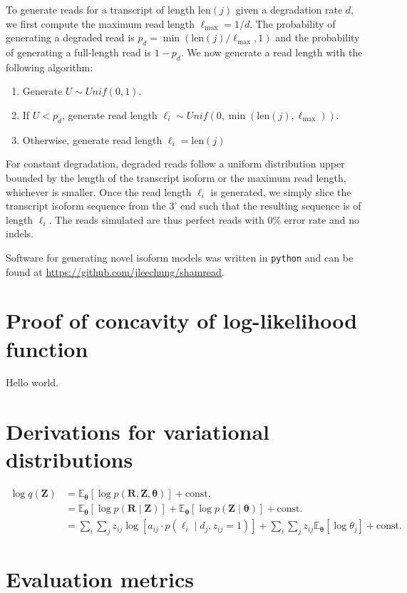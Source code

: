 To generate reads for a transcript of length $\mathrm{len}(j)$ given a degradation rate $d$, we first compute the maximum read length $\ell_\mathrm{max}=1/d$. The probability of generating a degraded read is $p_d=\min(\mathrm{len}(j)/\ell_\mathrm{max}, 1)$ and the probability of generating a full-length read is $1-p_d$. We now generate a read length with the following algorithm:
\begin{enumerate}
    \item Generate $U\sim Unif(0,1)$.
    \item If $U<p_d$, generate read length $\ell_i\sim Unif(0,\min(\mathrm{len}(j),\ell_\mathrm{max}))$.
    \item Otherwise, generate read length $\ell_i=\mathrm{len}(j)$
\end{enumerate}
For constant degradation, degraded reads follow a uniform distribution upper bounded by the length of the transcript isoform or the maximum read length, whichever is smaller. Once the read length $\ell_i$ is generated, we simply slice the transcript isoform sequence from the 3' end such that the resulting sequence is of length $\ell_i$. The reads simulated are thus perfect reads with 0\% error rate and no indels. 

Software for generating novel isoform models was written in \texttt{python} and can be found at \url{https://github.com/jleechung/shamread}.

\chapter{Proof of concavity of log-likelihood function}\label{sec:proof-log-lik}

Hello world.

\chapter{Derivations for variational distributions}\label{sec:variational-dist}

\begin{equation}
\begin{split}
    \log q(\bm{Z}) & = \mathbb{E}_{\bm\theta}\left[\log p(\bm{R},\bm{Z},\bm{\theta})\right] + \textrm{const.} \\
    & = \mathbb{E}_{\bm\theta}\left[\log p(\bm{R}\mid\bm{Z})\right] + \mathbb{E}_{\bm\theta}\left[\log p(\bm{Z}\mid\bm{\theta})\right] + \textrm{const.} \\
    & = \sum_i\sum_j z_{ij}\log\left[a_{ij}\cdot p(\ell_i\mid d_j,z_{ij}=1)\right] + \sum_i\sum_j z_{ij}\mathbb{E}_{\bm\theta}\left[\log\theta_j\right] + \textrm{const.}
\end{split}
\end{equation}

\chapter{Evaluation metrics}

\lipsum[32]